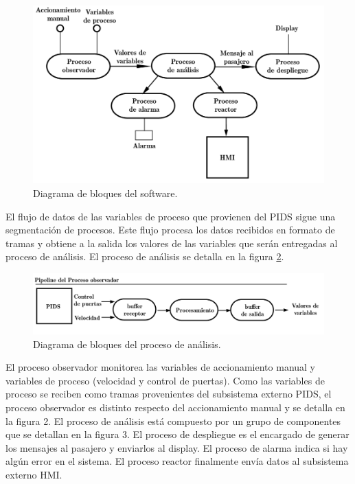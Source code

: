 \documentclass[
11pt, %
]{charter}
\begin{document}
\begin{figure}[htpb]
\centering 
\includegraphics[width=1\textwidth]{./Pics/observarYreaccionar.png}
\caption{Diagrama de bloques del software.}
\label{fig:pattern1}
\end{figure}

El flujo de datos de las variables de proceso que provienen del PIDS sigue una segmentación
de procesos. Este flujo procesa los datos recibidos en formato de tramas y obtiene a la salida
los valores de las variables que serán entregadas al proceso de análisis. El proceso de análisis
se detalla en la figura \ref{fig:pattern2}.

\begin{figure}[htpb]
\centering 
\includegraphics[width=1\textwidth]{./Pics/Pipeline.png}
\caption{Diagrama de bloques del proceso de análisis.}
\label{fig:pattern2}
\end{figure}

El proceso observador monitorea las variables de accionamiento manual y variables de proceso
(velocidad y control de puertas). Como las variables de proceso se reciben como tramas
provenientes del subsistema externo PIDS, el proceso observador es distinto respecto del
accionamiento manual y se detalla en la figura 2. El proceso de análisis está compuesto por un
grupo de componentes que se detallan en la figura 3. El proceso de despliegue es el encargado
de generar los mensajes al pasajero y enviarlos al display. El proceso de alarma indica si hay
algún error en el sistema. El proceso reactor finalmente envía datos al subsistema externo HMI.
\end{document}
